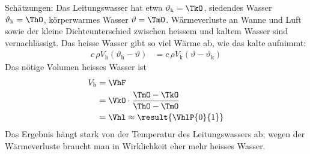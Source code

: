 Schätzungen: Das Leitungswasser hat etwa $\vartheta_\text{k} = \TkO$, siedendes Wasser $\vartheta_\text{h} = \ThO$, körperwarmes Wasser $\vartheta = \TmO$. Wärmeverluste an Wanne und Luft sowie der kleine Dichteunterschied zwischen heissem und kaltem Wasser sind vernachlässigt. Das heisse Wasser gibt so viel Wärme ab, wie das kalte aufnimmt:
\begin{align}
 c\,\rho V_\text{h}\left(\vartheta_\text{h}-\vartheta\right) &= c\,\rho V_\text{k}\left(\vartheta-\vartheta_\text{k}\right)
\end{align}
Das nötige Volumen heisses Wasser ist
\begin{align}
 V_\text{h} &= \VhF \\
   &= \VkO\cdot\frac{\TmO-\TkO}{\ThO-\TmO} \\
   &= \Vhl \approx \result{\VhlP{0}{1}}
\end{align}
Das Ergebnis hängt stark von der Temperatur des Leitungswassers ab; wegen der Wärmeverluste braucht man in Wirklichkeit eher mehr heisses Wasser.
